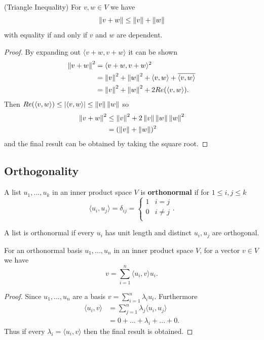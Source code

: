 \begin{corollary} (Triangle Inequality)
  For $v, w \in V$ we have
  \[\left\lVert v + w \right\rVert \leq \left\lVert v \right\rVert + \left\lVert w \right\rVert\]
  with equality if and only if $v$ and $w$ are dependent.
\end{corollary}
\begin{proof}
  By expanding out $\langle v + w, v+w \rangle$ it can be shown
    \begin{align*}
      \left\lVert v + w \right\rVert^2 &= \langle v + w, v + w \rangle^2 \\
       &= \left\lVert v \right\rVert^2 + \left\lVert w \right\rVert^2 + \langle v, w \rangle + \overline{ \langle v, w \rangle} \\
       &= \left\lVert v \right\rVert^2 + \left\lVert w \right\rVert^2 + 2 Re (\langle v, w \rangle)
    .\end{align*}
    Then $Re( \langle v, w \rangle) \leq | \langle v, w \rangle| \leq \left\lVert v \right\rVert\left\lVert w \right\rVert$ so
    \begin{align*}
      \left\lVert v + w \right\rVert^2 &\leq \left\lVert v \right\rVert^2 + 2 \left\lVert v \right\rVert \left\lVert w \right\rVert \left\lVert w \right\rVert^2 \\
                     &= (\left\lVert v \right\rVert + \left\lVert w \right\rVert)^2
    \end{align*}
    and the final result can be obtained by taking the square root.
\end{proof}

\subsection{Orthogonality}

\begin{definition}
  A list $u_1,...,u_k$ in an inner product space $V$ is {\bf orthonormal} if for $1 \leq i, j \leq k$
  \[\langle u_i, u_j \rangle = \delta_{ij} = \left\{\begin{array}{lr}
  1 & i = j\\
  0 & i \not = j\\
  \end{array} \right..\]
\end{definition}

\begin{remark}
    A list is orthonormal if every $u_i$ has unit length and distinct $u_i,u_j$ are orthogonal.
\end{remark}

\begin{lemma}
  For an orthonormal basis $u_1,...,u_n$ in an inner product space $V$, for a vector $v \in V$ we have
    \[v = \sum_{i = 1}^n \langle u_i, v \rangle u_i.\]
\end{lemma}
\begin{proof}
  Since $u_1, ..., u_n$ are a basis $v = \sum_{ i = 1}^{n} \lambda_i u_i$. Furthermore
  \begin{align*}
    \langle u_i, v \rangle &= \sum_{ j = 1}^{n} \lambda_j \langle u_i, u_j \rangle \\
                           &= 0 + ... + \lambda_i + ... + 0
  .\end{align*}
  Thus if every $\lambda_i = \langle u_i, v \rangle$ then the final result is obtained.
\end{proof}

